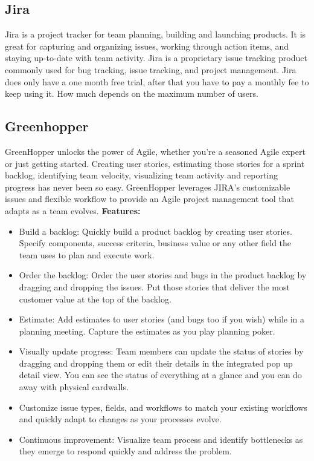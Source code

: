 \subsection{Jira}
Jira is a project tracker for team planning, building and launching products. It is great for capturing and organizing issues, working through action items, and staying up-to-date with team activity. Jira is a proprietary issue tracking product commonly used for bug tracking, issue tracking, and project management\cite{bib:atlassian}.
\newline
\newline
Jira does only have a one month free trial, after that you have to pay a monthly fee to keep using it. How much depends on the maximum number of users\cite{bib:jira}.

\subsection{Greenhopper}
GreenHopper unlocks the power of Agile, whether you're a seasoned Agile expert or just getting started. Creating user stories, estimating those stories for a sprint backlog, identifying team velocity, visualizing team activity and reporting progress has never been so easy.
\newline
\newline
GreenHopper leverages JIRA's customizable issues and flexible workflow to provide an Agile project management tool that adapts as a team evolves\cite{bib:green}.
\newline
\newline
\textbf{Features:}
\begin{itemize}
\item{}Build a backlog: Quickly build a product backlog by creating user stories. Specify components, success criteria, business value or any other field the team uses to plan and execute work.
\item{}Order the backlog: Order the user stories and bugs in the product backlog by dragging and dropping the issues. Put those stories that deliver the most customer value at the top of the backlog.
\item{}Estimate: Add estimates to user stories (and bugs too if you wish) while in a planning meeting. Capture the estimates as you play planning poker.
\item{}Visually update progress: Team members can update the status of stories by dragging and dropping them or edit their details in the integrated pop up detail view. You can see the status of everything at a glance and you can do away with physical cardwalls.
\item{}Customize issue types, fields, and workflows to match your existing workflows and quickly adapt to changes as your processes evolve.
\item{}Continuous improvement: Visualize team process and identify bottlenecks as they emerge to respond quickly and address the problem.
\end{itemize}